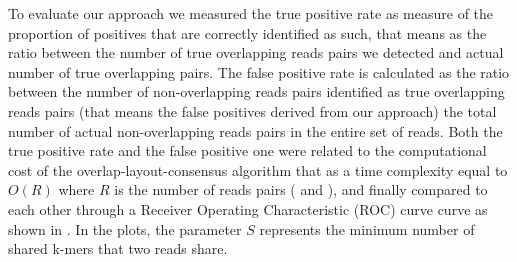 \documentclass[11pt]{article}
\begin{document}
To evaluate our approach we measured the true positive rate as measure of the proportion of positives that are correctly identified as such, that means as the ratio between the number of true overlapping reads pairs we detected and actual number of true overlapping pairs.
The false positive rate is calculated as the ratio between the number of non-overlapping reads pairs identified as true overlapping reads pairs (that means the false positives derived from our approach) the total number of actual non-overlapping reads pairs in the entire set of reads.
Both the true positive rate and the false positive one were related to the computational cost of the overlap-layout-consensus algorithm that as a time complexity equal to $O(R)$ where $R$ is the number of reads pairs ( and ), and finally compared to each other through a Receiver Operating Characteristic (ROC) curve curve as shown in .
In the plots, the parameter $S$ represents the minimum number of shared k-mers that two reads share.
\end{document}
